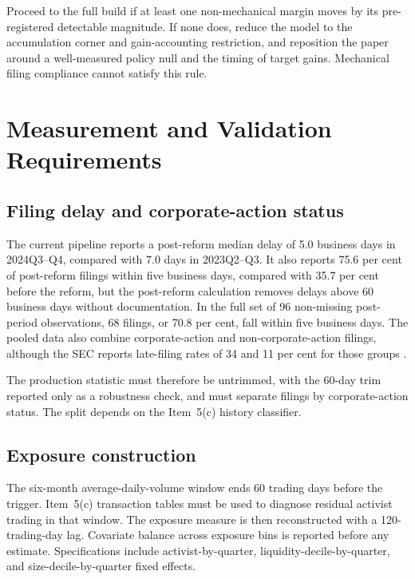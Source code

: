 Proceed to the full build if at least one non-mechanical margin moves by its
pre-registered detectable magnitude. If none does, reduce the model to the
accumulation corner and gain-accounting restriction, and reposition the paper
around a well-measured policy null and the timing of target gains. Mechanical
filing compliance cannot satisfy this rule.

\section{Measurement and Validation Requirements}
\label{sec:plan-validation}

\subsection{Filing delay and corporate-action status}

The current pipeline reports a post-reform median delay of 5.0 business days in
2024Q3--Q4, compared with 7.0 days in 2023Q2--Q3. It also reports 75.6 per cent
of post-reform filings within five business days, compared with 35.7 per cent
before the reform, but the post-reform calculation removes
delays above 60 business days without documentation. In the full set of 96
non-missing post-period observations, 68 filings, or 70.8 per cent, fall within
five business days. The pooled data also combine corporate-action and
non-corporate-action filings, although the SEC reports late-filing rates of
34 and 11 per cent for those groups \parencite{sec2023modernization}.

The production statistic must therefore be untrimmed, with the 60-day trim
reported only as a robustness check, and must separate filings by
corporate-action status. The split depends on the Item~5(c) history classifier.

\subsection{Exposure construction}

The six-month average-daily-volume window ends 60 trading days before the
trigger. Item~5(c) transaction tables must be used to diagnose residual
activist trading in that window. The exposure measure is then reconstructed
with a 120-trading-day lag. Covariate balance across exposure bins is reported
before any estimate. Specifications include activist-by-quarter,
liquidity-decile-by-quarter, and size-decile-by-quarter fixed effects.


